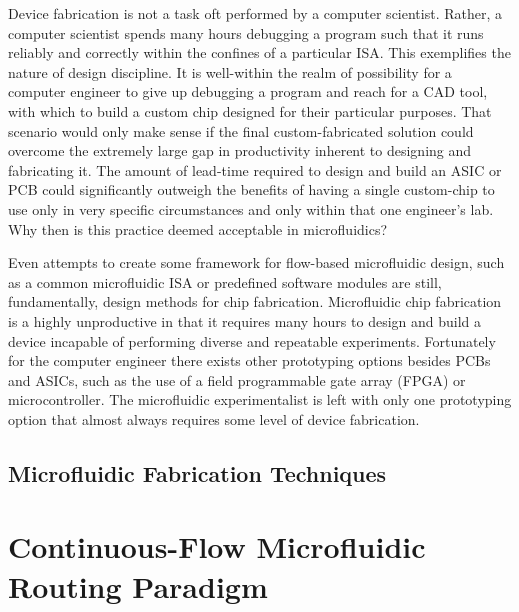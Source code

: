 Device fabrication is not a task oft performed by a computer scientist. Rather, a computer scientist spends many hours debugging a program such that it runs reliably and correctly within the confines of a particular ISA. This exemplifies the nature of design discipline. It is well-within the realm of possibility for a computer engineer to give up debugging a program and reach for a CAD tool, with which to build a custom chip designed for their particular purposes. That scenario would only make sense if the final custom-fabricated solution could overcome the extremely large gap in productivity inherent to designing and fabricating it. The amount of lead-time required to design and build an ASIC or PCB could significantly outweigh the benefits of having a single custom-chip to use only in very specific circumstances and only within that one engineer's lab. Why then is this practice deemed acceptable in microfluidics?

Even attempts to create some framework for flow-based microfluidic design, such as a common microfluidic ISA\cite{amin2009} or predefined software modules \cite{soe2013} are still, fundamentally, design methods for chip fabrication. Microfluidic chip fabrication is a highly unproductive in that it requires many hours to design and build a device incapable of performing diverse and repeatable experiments. Fortunately for the computer engineer there exists other prototyping options besides PCBs and ASICs, such as the use of a field programmable gate array (FPGA) or microcontroller. The microfluidic experimentalist is left with only one prototyping option that almost always requires some level of device
fabrication.


\subsection{Microfluidic Fabrication Techniques}

\section{Continuous-Flow Microfluidic Routing Paradigm}
\label{sec:backgroundCFRouting}

